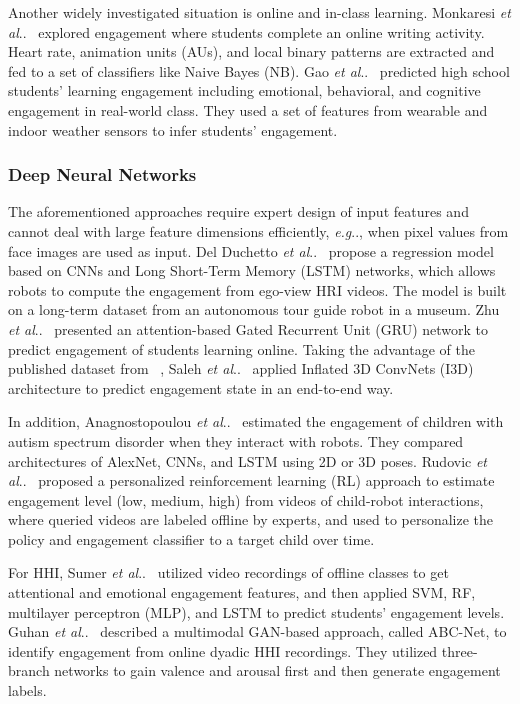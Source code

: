 \documentclass[10pt,journal,compsoc]{IEEEtran}
\makeatletter
\DeclareRobustCommand\onedot{\futurelet\@let@token\@onedot}
\def\@onedot{\ifx\@let@token.\else.\null\fi\xspace}
\def\eg{\emph{e.g}\onedot} \def\Eg{\emph{E.g}\onedot}
\def\etal{\emph{et al}\onedot}
\makeatother
\begin{document}
Another widely investigated situation is online and in-class learning. Monkaresi \etal~\cite{Monkaresi2017Automated} explored engagement where students complete an online writing activity. Heart rate, animation units (AUs), and local binary patterns are extracted and fed to a set of classifiers like Naive Bayes (NB). Gao \etal~\cite{Gao2020NGage} predicted high school students' learning engagement including emotional, behavioral, and cognitive engagement in real-world class. They used a set of features from wearable and indoor weather sensors to infer students' engagement.

\subsubsection{Deep Neural Networks}

The aforementioned approaches require expert design of input features and cannot deal with large feature dimensions efficiently, \eg, when pixel values from face images are used as input. Del Duchetto \etal~\cite{DelDuchetto2020Are} propose a regression model based on CNNs and Long Short-Term Memory (LSTM) networks, which allows robots to compute the engagement from ego-view HRI videos. The model is built on a long-term dataset from an autonomous tour guide robot in a museum. Zhu \etal~\cite{Zhu2020Multirate} presented an attention-based Gated Recurrent Unit (GRU) network to predict engagement of students learning online. Taking the advantage of the published dataset from ~\cite{BenYoussef2019Early}, Saleh \etal~\cite{Saleh2021Improving} applied Inflated 3D ConvNets (I3D) architecture to predict engagement state in an end-to-end way.

In addition, Anagnostopoulou \etal~\cite{Anagnostopoulou2021Engagement} estimated the engagement of children with autism spectrum disorder when they interact with robots. They compared architectures of AlexNet, CNNs, and LSTM using 2D or 3D poses. Rudovic \etal~\cite{Rudovic2019Personalized} proposed a personalized reinforcement learning (RL) approach to estimate engagement level (low, medium, high) from videos of child-robot interactions, where queried videos are labeled offline by experts, and used to personalize the policy and engagement classifier to a target child over time.

For HHI, Sumer \etal~\cite{Sumer2021Multimodal} utilized video recordings of offline classes to get attentional and emotional engagement features, and then applied SVM, RF, multilayer perceptron (MLP), and LSTM to predict students' engagement levels. Guhan \etal~\cite{Guhan2020ABCNet} described a multimodal GAN-based approach, called ABC-Net, to identify engagement from online dyadic HHI recordings. They utilized three-branch networks to gain valence and arousal first and then generate engagement labels.
\end{document}
